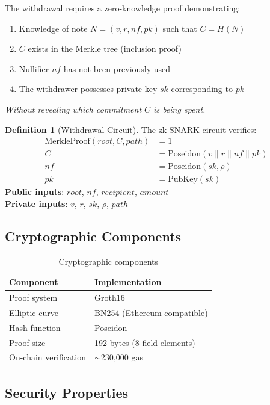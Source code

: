\documentclass[11pt]{article}
\theoremstyle{definition}
\newtheorem{definition}{Definition}[section]
\theoremstyle{plain}
\theoremstyle{remark}
\begin{document}
The withdrawal requires a zero-knowledge proof demonstrating:
\begin{enumerate}
    \item Knowledge of note $N = (v, r, nf, pk)$ such that $C = H(N)$
    \item $C$ exists in the Merkle tree (inclusion proof)
    \item Nullifier $nf$ has not been previously used
    \item The withdrawer possesses private key $sk$ corresponding to $pk$
\end{enumerate}
\textit{Without revealing which commitment $C$ is being spent.}

\begin{definition}[Withdrawal Circuit]
The zk-SNARK circuit verifies:
\begin{align}
\text{MerkleProof}(root, C, path) &= 1 \\
C &= \text{Poseidon}(v \| r \| nf \| pk) \\
nf &= \text{Poseidon}(sk, \rho) \\
pk &= \text{PubKey}(sk)
\end{align}
\textbf{Public inputs}: $root$, $nf$, $recipient$, $amount$ \\
\textbf{Private inputs}: $v$, $r$, $sk$, $\rho$, $path$
\end{definition}

\subsection{Cryptographic Components}

\begin{table}[H]
\centering
\caption{Cryptographic components}
\label{tab:crypto}
\begin{tabular}{ll}
\toprule
\textbf{Component} & \textbf{Implementation} \\
\midrule
Proof system & Groth16~\cite{groth2016size} \\
Elliptic curve & BN254 (Ethereum compatible) \\
Hash function & Poseidon~\cite{grassi2021poseidon} \\
Proof size & 192 bytes (8 field elements) \\
On-chain verification & $\sim$230,000 gas \\
\bottomrule
\end{tabular}
\end{table}

\subsection{Security Properties}
\end{document}
